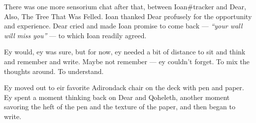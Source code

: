 There was one more sensorium chat after that, between Ioan\#tracker and Dear, Also, The Tree That Was Felled. Ioan thanked Dear profusely for the opportunity and experience. Dear cried and made Ioan promise to come back --- \emph{``your wall will miss you''} --- to which Ioan readily agreed.

Ey would, ey was sure, but for now, ey needed a bit of distance to sit and think and remember and write. Maybe not remember --- ey couldn't forget. To mix the thoughts around. To understand.

Ey moved out to eir favorite Adirondack chair on the deck with pen and paper. Ey spent a moment thinking back on Dear and Qoheleth, another moment savoring the heft of the pen and the texture of the paper, and then began to write.
